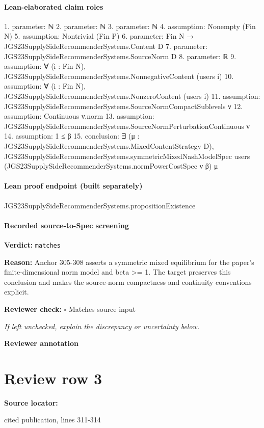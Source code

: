 \documentclass[10pt]{article}
\newcommand{\reviewerbox}{%
  \par\noindent\fbox{\parbox{0.96\linewidth}{\rule{0pt}{0.38in}}}\par
}
\newcommand{\reviewmatch}[1]{%
  \par\noindent\textbf{Reviewer check:} $\square$\; #1\par
  \noindent\emph{If left unchecked, explain the discrepancy or uncertainty below.}\par
}
\begin{document}
\paragraph{Lean-elaborated claim roles}\begin{ReviewVerbatim}
1. parameter: ℕ
2. parameter: ℕ
3. parameter: ℕ
4. assumption: Nonempty (Fin N)
5. assumption: Nontrivial (Fin P)
6. parameter: Fin N → JGS23SupplySideRecommenderSystems.Content D
7. parameter: JGS23SupplySideRecommenderSystems.SourceNorm D
8. parameter: ℝ
9. assumption: ∀ (i : Fin N), JGS23SupplySideRecommenderSystems.NonnegativeContent (users i)
10. assumption: ∀ (i : Fin N), JGS23SupplySideRecommenderSystems.NonzeroContent (users i)
11. assumption: JGS23SupplySideRecommenderSystems.SourceNormCompactSublevels ν
12. assumption: Continuous ν.norm
13. assumption: JGS23SupplySideRecommenderSystems.SourceNormPerturbationContinuous ν
14. assumption: 1 ≤ β
15. conclusion: ∃ (μ : JGS23SupplySideRecommenderSystems.MixedContentStrategy D),
  JGS23SupplySideRecommenderSystems.symmetricMixedNashModelSpec users
    (JGS23SupplySideRecommenderSystems.normPowerCostSpec ν β) μ
\end{ReviewVerbatim}

\paragraph{Lean proof endpoint (built separately)}\begin{ReviewVerbatim}
JGS23SupplySideRecommenderSystems.propositionExistence
\end{ReviewVerbatim}

\paragraph{Recorded source-to-Spec screening}
\textbf{Verdict:} \texttt{matches}
\\
{\raggedright
\textbf{Reason:} Anchor 305-\allowbreak{}308 asserts a symmetric mixed equilibrium for the paper's finite-\allowbreak{}dimensional norm model and beta >= 1.\allowbreak{}  The target preserves this conclusion and makes the source-\allowbreak{}norm compactness and continuity conventions explicit.\allowbreak{}
\par}
\reviewmatch{Matches source input}
\noindent\textbf{Reviewer annotation}\par
\reviewerbox
\clearpage
\hypertarget{source-claim-e16394dbd1f34803}{}
\section*{Review row 3}
\textbf{Source locator:} {\footnotesize\raggedright cited publication, lines 311-\allowbreak{}314\par}
\end{document}
